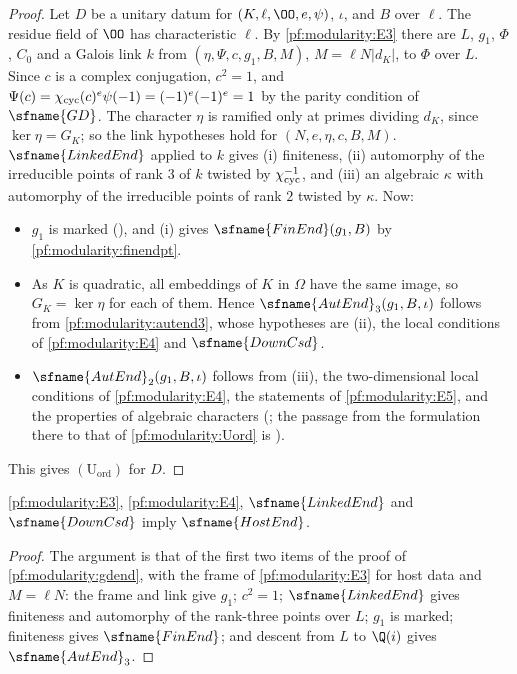 \begin{proof}
Let $D$ be a unitary datum for $(K,\ell,\OO,e,\psi)$, $\iota$, and $B$ over $\ell$. The residue field of $\OO$ has
characteristic $\ell$. By \ref{pf:modularity:E3} there are $L$, $g_1$, $\Phi$, $C_0$ and a Galois link $k$ from
$(\eta,\Psi,c,g_1,B,M)$, $M=\ell N|d_K|$, to $\Phi$ over $L$. Since $c$ is a complex conjugation, $c^2=1$, and
$\Psi(c)=\chi_{\mathrm{cyc}}(c)^e\psi(-1)=(-1)^e(-1)^e=1$ by the parity condition of $\sfname{GD}$. The character $\eta$ is
ramified only at primes dividing $d_K$, since $\ker\eta=G_K$; so the link hypotheses hold for $(N,e,\eta,c,B,M)$.
$\sfname{LinkedEnd}$ applied to $k$ gives (i) finiteness, (ii) automorphy of the irreducible points of rank $3$ of $k$
twisted by $\chi_{\mathrm{cyc}}^{-1}$, and (iii) an algebraic $\kappa$ with automorphy of the irreducible points of rank $2$
twisted by $\kappa$. Now:
\begin{itemize}
\item $g_1$ is marked (), and (i) gives $\sfname{FinEnd}(g_1,B)$ by
\cref{pf:modularity:finendpt}.
\item As $K$ is quadratic, all embeddings of $K$ in $\Omega$ have the same image, so $G_K=\ker\eta$ for each of them.
Hence $\sfname{AutEnd}_3(g_1,B,\iota)$ follows from \cref{pf:modularity:autend3}, whose hypotheses are (ii), the local
conditions of \ref{pf:modularity:E4} and $\sfname{DownCsd}$.
\item $\sfname{AutEnd}_2(g_1,B,\iota)$ follows from (iii), the two-dimensional local conditions of
\ref{pf:modularity:E4}, the statements of \ref{pf:modularity:E5}, and the properties of algebraic characters
(; the passage from the formulation there to that of
\cref{pf:modularity:Uord} is ).
\end{itemize}
This gives $(\mathrm{U}_{\mathrm{ord}})$ for $D$.
\end{proof}

\begin{proposition}\label{pf:modularity:hostend}
\ref{pf:modularity:E3}, \ref{pf:modularity:E4}, $\sfname{LinkedEnd}$ and $\sfname{DownCsd}$ imply $\sfname{HostEnd}$.
\end{proposition}

\begin{proof}
The argument is that of the first two items of the proof of \cref{pf:modularity:gdend}, with the frame of
\ref{pf:modularity:E3} for host data and $M=\ell N$: the frame and link give $g_1$; $c^2=1$; $\sfname{LinkedEnd}$ gives
finiteness and automorphy of the rank-three points over $L$; $g_1$ is marked; finiteness gives $\sfname{FinEnd}$; and
descent from $L$ to $\Q(i)$ gives $\sfname{AutEnd}_3$.
\end{proof}

